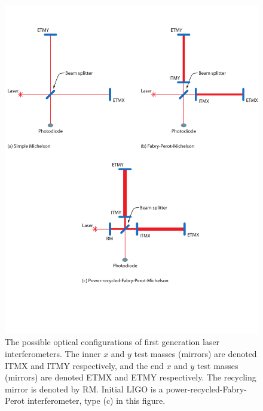 \begin{figure}[p]
\begin{center}
\includegraphics[width=\linewidth]{figures/inspiral/ifoconfigs}
\end{center}
\caption[Optical Configuration of LIGO]{%
\label{f:ifodesign}
The possible optical configurations of first generation laser interferometers.
The inner $x$ and $y$ test masses (mirrors) are denoted ITMX and ITMY
respectively, and the end $x$ and $y$ test masses (mirrors) are denoted ETMX
and ETMY respectively. The recycling mirror is denoted by RM.  Initial LIGO is
a power-recycled-Fabry-Perot interferometer, type (c) in this figure.
}
\end{figure}


